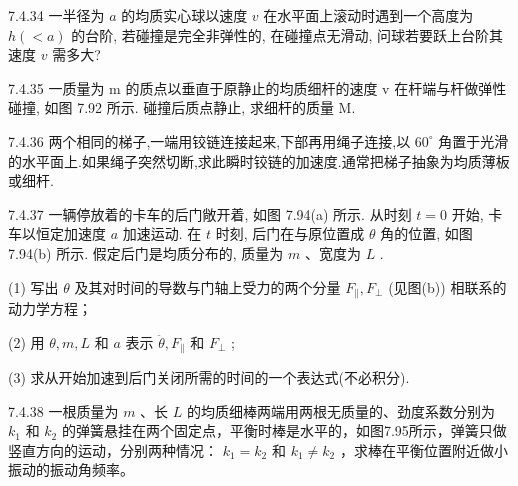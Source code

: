 \begin{problem}{7.4.34}
一半径为 $a$ 的均质实心球以速度 $v$ 在水平面上滚动时遇到一个高度为 $h(< a)$ 的台阶, 若碰撞是完全非弹性的, 在碰撞点无滑动, 问球若要跃上台阶其速度 $v$ 需多大?
\end{problem}
\clearpage


\begin{problem}{7.4.35}
一质量为 m 的质点以垂直于原静止的均质细杆的速度 v 在杆端与杆做弹性碰撞, 如图 7.92 所示. 碰撞后质点静止, 求细杆的质量 M.
\begin{center}

\end{center}
\end{problem}
\clearpage


\begin{problem}{7.4.36}
两个相同的梯子,一端用铰链连接起来,下部再用绳子连接,以 $60^{\circ}$ 角置于光滑的水平面上.如果绳子突然切断,求此瞬时铰链的加速度.通常把梯子抽象为均质薄板或细杆.
\end{problem}
\clearpage


\begin{problem}{7.4.37}
一辆停放着的卡车的后门敞开着, 如图 7.94(a) 所示. 从时刻 $t = 0$ 开始, 卡车以恒定加速度 $a$ 加速运动. 在 $t$ 时刻, 后门在与原位置成 $\theta$ 角的位置, 如图 7.94(b) 所示. 假定后门是均质分布的, 质量为 $m$ 、宽度为 $L$ .

(1) 写出 $\theta$ 及其对时间的导数与门轴上受力的两个分量 $F_{\parallel}, F_{\perp}$ (见图(b)) 相联系的动力学方程；

(2) 用 $\theta, m, L$ 和 $a$ 表示 $\ddot{\theta}, F_{\parallel}$ 和 $F_{\perp}$ ;

(3) 求从开始加速到后门关闭所需的时间的一个表达式(不必积分).
\begin{center}

\end{center}
\end{problem}
\clearpage


\begin{problem}{7.4.38}
一根质量为 $m$ 、长 $L$ 的均质细棒两端用两根无质量的、劲度系数分别为 $k_{1}$ 和 $k_{2}$ 的弹簧悬挂在两个固定点，平衡时棒是水平的，如图7.95所示，弹簧只做竖直方向的运动，分别两种情况： $k_{1} = k_{2}$ 和 $k_{1} \neq k_{2}$ ，求棒在平衡位置附近做小振动的振动角频率。
\begin{center}

\end{center}
\end{problem}
\clearpage


